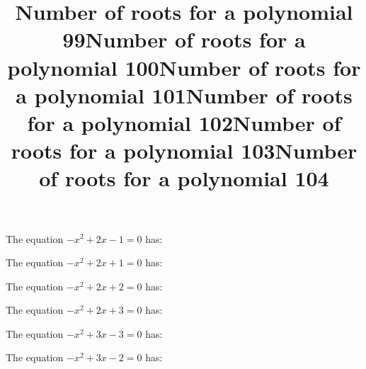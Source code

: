 \documentclass{article}
\begin{document}
\begin{category}
\begin{question}[multichoice]


\end{question}
\begin{question}[multichoice]
\title{Number of roots for a polynomial 99}
The equation $- x^{2} + 2 x - 1=0$ has:



\end{question}
\begin{question}[multichoice]
\title{Number of roots for a polynomial 100}
The equation $- x^{2} + 2 x + 1=0$ has:



\end{question}
\begin{question}[multichoice]
\title{Number of roots for a polynomial 101}
The equation $- x^{2} + 2 x + 2=0$ has:



\end{question}
\begin{question}[multichoice]
\title{Number of roots for a polynomial 102}
The equation $- x^{2} + 2 x + 3=0$ has:



\end{question}
\begin{question}[multichoice]
\title{Number of roots for a polynomial 103}
The equation $- x^{2} + 3 x - 3=0$ has:



\end{question}
\begin{question}[multichoice]
\title{Number of roots for a polynomial 104}
The equation $- x^{2} + 3 x - 2=0$ has:




\end{question}
\end{category}
\end{document}
